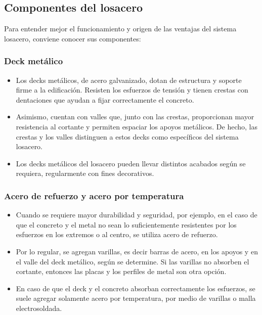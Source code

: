 \documentclass[12pt]{article}
\begin{document}
	
	
	\subsection{Componentes del losacero}
	
	Para entender mejor el funcionamiento y origen de las ventajas del sistema losacero, conviene conocer sus componentes:
	
	
	\subsubsection{Deck metálico}
	
	\begin{itemize}
	\item Los decks metálicos, de acero galvanizado, dotan de estructura y soporte firme a la edificación. Resisten los esfuerzos de tensión y tienen crestas con dentaciones que ayudan a fijar correctamente el concreto.
		
	\item Asimismo, cuentan con valles que, junto con las crestas, proporcionan mayor resistencia al cortante y permiten espaciar los apoyos metálicos. De hecho, las crestas y los valles distinguen a estos decks como específicos del sistema losacero.
	
	\item Los decks metálicos del losacero pueden llevar distintos acabados según se requiera, regularmente con fines decorativos.
	
	\end{itemize}
	
		
	\subsubsection{Acero de refuerzo y acero por temperatura}
	
	\begin{itemize}
	\item Cuando se requiere mayor durabilidad y seguridad, por ejemplo, en el caso de que el concreto y el metal no sean lo suficientemente resistentes por los esfuerzos en los extremos o al centro, se utiliza acero de refuerzo.
	
	
	\item Por lo regular, se agregan varillas, es decir barras de acero, en los apoyos y en el valle del deck metálico, según se determine. Si las varillas no absorben el cortante, entonces las placas y los perfiles de metal son otra opción.
	
	
	\item En caso de que el deck y el concreto absorban correctamente los esfuerzos, se suele agregar solamente acero por temperatura, por medio de varillas o malla electrosoldada.
	
	\end{itemize}
		
\end{document}
